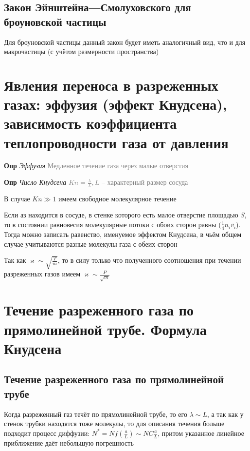 \documentclass[a4paper, 14pt]{article}
\begin{document}
    \subsection{Закон Эйнштейна—Смолуховского для броуновской частицы}
    
    Для броуновской частицы данный закон будет иметь аналогичный вид, что и для макрочастицы (с учётом размерности
    пространства)
    
    \section{Явления переноса в разреженных газах: эффузия (эффект Кнудсена), зависимость коэффициента
    теплопроводности газа от давления}
    
    \textbf{Опр} \textit{Эффузия} \textcolor{gray}{Медленное течение газа через малые отверстия}
    
    \textbf{Опр} \textit{Число Кнудсена} \textcolor{gray}{$Kn = \frac{\lambda}{L}, L$ -- характерный размер сосуда}
    
    В случае $Kn \gg 1$ имеем свободное молекулярное течение
    
    Если аз находится в сосуде, в стенке которого есть малое отверстие площадью $S$, то в состоянии равновесия
    молекулярные потоки с обоих сторон равны ($\frac{1}{4} n_i \overline{v_i}$).
    Тогда можно записать равенство, именуемое эффектом Кнудсена, в чьём общем случае учитываются разные молекулы газа
    с обеих сторон
    
    Так как $\varkappa \sim \sqrt{\frac{T}{m}}$, то в силу только что полученного соотношения при течении
    разреженных газов имеем $\varkappa \sim \frac{P}{\sqrt{m}}$
    
    \section{Течение разреженного газа по прямолинейной трубе.
    Формула Кнудсена}
    
    \subsection{Течение разреженного газа по прямолинейной трубе}
    
    Когда разреженный газ течёт по прямолинейной трубе, то его $\lambda \sim L$, а так как у стенок трубки находятся
    тоже молекулы, то для описания течения больше подходит процесс диффузии: $N^* = N f\left(\frac{a}{L}\right) \sim
    NC\frac{a}{L}$, притом указанное линейное приближение даёт небольшую погрешность
    
\end{document}

